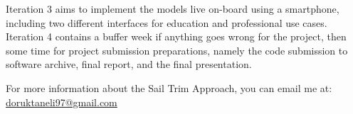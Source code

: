 Iteration 3 aims to implement the models live on-board using a smartphone, including two different interfaces for education and professional use cases. Iteration 4 contains a buffer week if anything goes wrong for the project, then some time for project submission preparations, namely the code submission to software archive, final report, and the final presentation.

For more information about the Sail Trim Approach, you can email me at:\\
\href{mailto:doruktaneli97@gmail.com}{doruktaneli97@gmail.com}